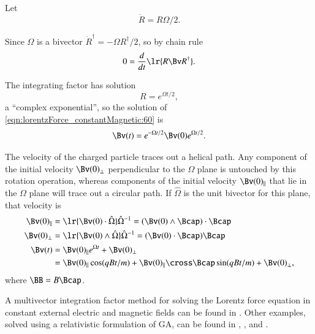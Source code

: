 Let
\begin{equation}\label{eqn:lorentzForce_constantMagnetic:140}
\dot{R} = R \Omega/2.
\end{equation}

Since \( \Omega \) is a bivector \( \dot{R}^\dagger = -\Omega R^\dagger/2 \), so by chain rule
\begin{equation}\label{eqn:lorentzForce_constantMagnetic:160}
0 = \frac{d}{dt} \lr{ R \Bv R^\dagger }.
\end{equation}

The integrating factor has solution
\begin{equation}\label{eqn:lorentzForce_constantMagnetic:180}
R = e^{\Omega t/2},
\end{equation}
a ``complex exponential'', so the solution of \cref{eqn:lorentzForce_constantMagnetic:60} is
\begin{equation}\label{eqn:lorentzForce_constantMagnetic:200}
\Bv(t) = e^{-\Omega t/2} \Bv(0) e^{\Omega t/2}.
\end{equation}

The velocity of the charged particle traces out a helical path.
Any component of the initial velocity \( \Bv(0)_\perp \) perpendicular to the \( \Omega \) plane is untouched by this rotation operation, whereas components of the initial velocity \( \Bv(0)_\parallel \) that lie in the \( \Omega \) plane will trace out a circular path.
If \( \hat{\Omega} \) is the unit bivector for this plane, that velocity is
\begin{equation}\label{eqn:lorentzForce_constantMagnetic:220}
\begin{aligned}
\Bv(0)_\parallel &= \lr{ \Bv(0) \cdot \hat{\Omega} } \hat{\Omega}^{-1}
                  = (\Bv(0) \wedge \Bcap) \cdot \Bcap \\
\Bv(0)_\perp &= \lr{ \Bv(0) \wedge \hat{\Omega} } \hat{\Omega}^{-1}
              = (\Bv(0) \cdot \Bcap) \Bcap \\
\Bv(t) &=
\Bv(0)_\parallel e^{\Omega t} + \Bv(0)_\perp \\
       &=
\Bv(0)_\parallel \cos( q B t/ m )
+
\Bv(0)_\parallel \cross \Bcap \sin( q B t/ m )
+ \Bv(0)_\perp,
\end{aligned}
\end{equation}
where \( \BB = B \Bcap \).

A multivector integration factor method for solving the Lorentz force equation in constant external electric and magnetic fields can be found in \citep{hestenes1999nfc}.  Other examples, solved using a relativistic formulation of GA, can be found in \citep{doran2003gap},
\citep{hestenes1974properdynamics}, and
\citep{hestenes1974propermechanics}.

